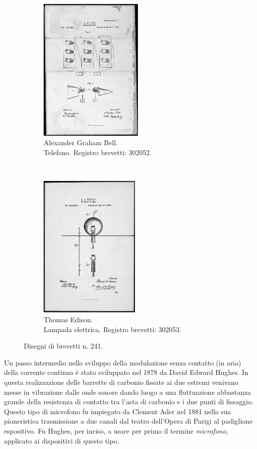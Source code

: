 \begin{refsection}
\begin{figure}[t!]
    \centering
    \begin{subfigure}[t]{0.4\textwidth}
        \centering
        \includegraphics[height=7cm]{CAPITOLI/0200/img/telephone-patent-drawing-l.jpg}
        \caption[]{Alexander Graham Bell.\\ Telefono. Registro brevetti: 302052.}
        \label{agb:tel}
    \end{subfigure}%
    ~
    \begin{subfigure}[t]{0.48\textwidth}
        \centering
        \includegraphics[height=7cm]{CAPITOLI/0200/img/light-patent-drawing-l.jpg}
        \caption[]{Thomas Edison. \\ Lampada elettrica. Registro brevetti: 302053.}
        \label{te:lamp}
    \end{subfigure}
    \caption[]{Disegni di brevetti n. 241.}
    \label{pol:msmatrix}
\end{figure}

Un passo intermedio nello sviluppo della modulazione senza contatto (in aria) della
corrente continua è stato sviluppato nel 1878 da David Edward Hughes. In questa
realizzazione delle barrette di carbonio fissate ai due estremi venivano messe in
vibrazione dalle onde sonore dando luogo a una fluttuazione abbastanza grande
della resistenza
di contatto tra l'asta di carbonio e i due punti di fissaggio. Questo tipo di
microfono fu impiegato da Clement Ader nel 1881 nella sua pioneristica trasmissione a due
canali dal teatro dell'Opera di Parigi al padiglione espositivo.
Fu Hughes, per inciso, a usare per primo il termine \emph{microfono}, applicato
ai dispositivi di questo tipo.


\end{refsection}
